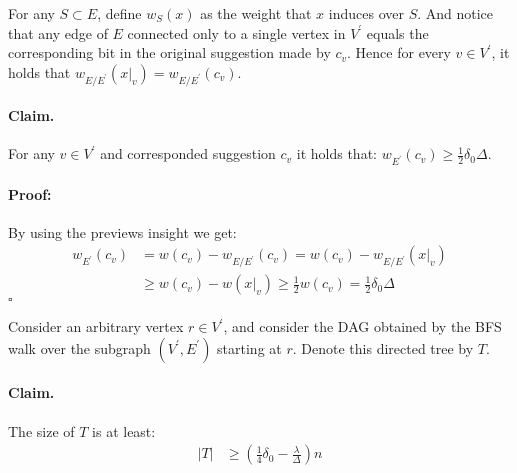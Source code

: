 \documentclass[sigplan,screen]{acmart}
\begin{document}
\begin{multicols*}{2}
  For any $S \subset E$, define $w_{S}\left( x \right)$ as the weight that $x$ induces over $S$. And notice that any edge of $E$ connected only to a single vertex in $V^\prime$ equals the corresponding bit in the original suggestion made by $c_{v}$. Hence for every $v\in V^\prime$, it holds that $w_{E / E^\prime}\left(x|_{v}\right) = w_{E / E^\prime}\left(c_{v}\right)$. 

%
  \paragraph{Claim.} For any $v \in V^\prime$ and corresponded suggestion $c_{v}$ it holds that: $w_{E^\prime}\left( c_{v} \right) \ge \frac{1}{2}\delta_{0}\Delta$. 
  \paragraph{Proof:}By using the previews insight we get: \begin{equation*}
    \begin{split}
      w_{E^\prime}\left( c_{v} \right) &= w\left( c_{v} \right) - w_{E / E^\prime}\left( c_{v} \right) =  w\left( c_{v} \right) - w_{E / E^\prime}\left( x|_{v} \right) \\ 
      & \ge  w\left( c_{v} \right) - w\left( x|_{v} \right) \ge \frac{1}{2}w\left( c_{v} \right) = \frac{1}{2}\delta_{0}\Delta 
    \end{split}
  \end{equation*}
  $\square$

  Consider an arbitrary vertex $r \in V^\prime$, and consider the DAG obtained by the BFS walk over the subgraph $\left(V^\prime, E^\prime \right)$ starting at $r$. Denote this directed tree by $T$.


  \paragraph{Claim.} The size of $T$ is at least:
  \begin{equation*}
    \begin{split}
      |T| & \ge \left( \frac{1}{4}\delta_{0} - \frac{\lambda}{\Delta} \right)n 
    \end{split}
  \end{equation*}

\end{multicols*}
\end{document}
